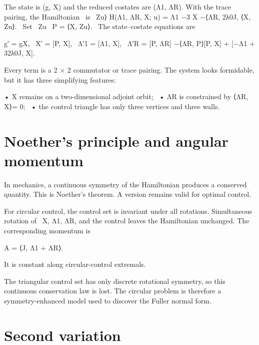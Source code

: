 \begin{displaytext}
The state is (g, X) and the reduced costates are (Λ1, ΛR). With the trace pairing, the Hamiltonian \
is \
Zu⟩ H(Λ1, ΛR, X; u) = Λ1 −3 X −⟨ΛR, 2λ0J, ⟨X, Zu⟩. \
Set \
Zu \
P = ⟨X, Zu⟩. \
The state–costate equations are
\end{displaytext}

\begin{displaytext}
g′ = gX, \
X′ = [P, X], \
Λ′1 = [Λ1, X], \
Λ′R = [P, ΛR] −⟨ΛR, P⟩[P, X] + [−Λ1 + 32λ0J, X].
\end{displaytext}

Every term is a 2 × 2 commutator or trace pairing. The system looks formidable, but it has three simplifying features:


\begin{displaytext}
• X remains on a two-dimensional adjoint orbit; \
• ΛR is constrained by ⟨ΛR, X⟩= 0; \
• the control triangle has only three vertices and three walls.
\end{displaytext}

\section{Noether’s principle and angular momentum}

In mechanics, a continuous symmetry of the Hamiltonian produces a conserved quantity. This is Noether’s theorem. A version remains valid for optimal control.


\begin{displaytext}
For circular control, the control set is invariant under all rotations. Simultaneous rotation of \
X, Λ1, ΛR, and the control leaves the Hamiltonian unchanged. The corresponding momentum is
\end{displaytext}

\begin{displaytext}
A = ⟨J, Λ1 + ΛR⟩.
\end{displaytext}

It is constant along circular-control extremals.


The triangular control set has only discrete rotational symmetry, so this continuous conservation law is lost. The circular problem is therefore a symmetry-enhanced model used to discover the Fuller normal form.


\section{Second variation}

